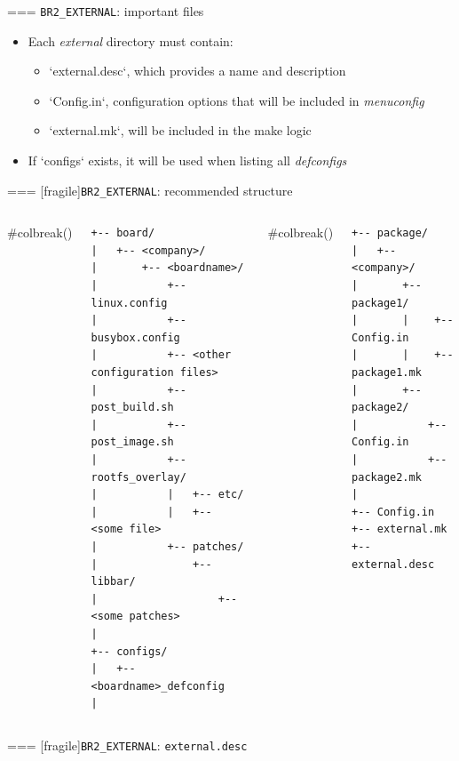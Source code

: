 === {{\tt BR2\_EXTERNAL}: important files}
  \begin{itemize}
  \item Each {\em external} directory must contain:
    \begin{itemize}
    \item `external.desc`, which provides a name and description
    \item `Config.in`, configuration options that will be
      included in {\em menuconfig}
    \item `external.mk`, will be included in the make logic
    \end{itemize}
  \item If `configs` exists, it will be used when listing all
    {\em defconfigs}
  \end{itemize}


=== [fragile]{{\tt BR2\_EXTERNAL}: recommended structure}
  \footnotesize
  \begin{columns}[b]
   #colbreak()
  \begin{block}{}
\begin{verbatim}
+-- board/
|   +-- <company>/
|       +-- <boardname>/
|           +-- linux.config
|           +-- busybox.config
|           +-- <other configuration files>
|           +-- post_build.sh
|           +-- post_image.sh
|           +-- rootfs_overlay/
|           |   +-- etc/
|           |   +-- <some file>
|           +-- patches/
|               +-- libbar/
|                   +-- <some patches>
|
+-- configs/
|   +-- <boardname>_defconfig
|
\end{verbatim}
   \end{block}
    #colbreak()
   \begin{block}{}
\begin{verbatim}
+-- package/
|   +-- <company>/
|       +-- package1/
|       |    +-- Config.in
|       |    +-- package1.mk
|       +-- package2/
|           +-- Config.in
|           +-- package2.mk
|
+-- Config.in
+-- external.mk
+-- external.desc
\end{verbatim}
   \end{block}
  \end{columns}


=== [fragile]{{\tt BR2\_EXTERNAL}: {\tt external.desc}}

